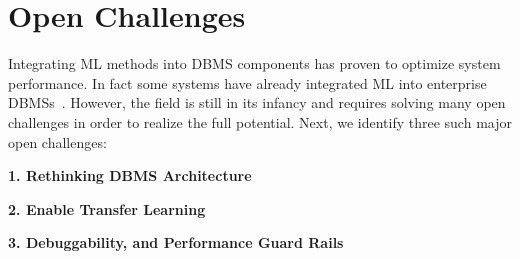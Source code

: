 \section{Open Challenges}
Integrating ML methods into DBMS components has proven to optimize system performance.
In fact some systems have already integrated ML into enterprise DBMSs~\cite{leo, cardlearner, verdict}.
However, the field is still in its infancy and requires solving many open challenges in order to realize the full potential.
Next, we identify three such major open challenges:


\vspace{2mm}
\noindent \textbf{1. Rethinking DBMS Architecture}



\vspace{2mm}
\noindent \textbf{2. Enable Transfer Learning}



\vspace{2mm}
\noindent \textbf{3. Debuggability, and Performance Guard Rails}

